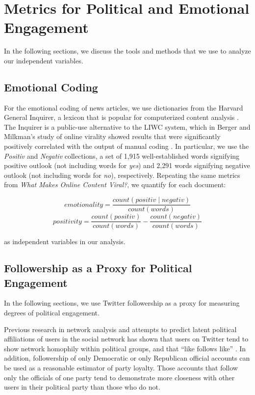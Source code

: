  \chapter{Metrics for Political and Emotional Engagement}

 In the following sections, we discuss the tools and methods that we use to analyze our independent variables.
 
\section{Emotional Coding}
For the emotional coding of news articles, we use dictionaries from the Harvard General Inquirer, a lexicon that is popular for computerized content analysis \cite{stone1963computer}. The Inquirer is a public-use alternative to the LIWC system, which in Berger and Milkman’s study of online virality showed results that were significantly positively correlated with the output of manual coding \cite{berger2012makes}. In particular, we use the \emph{Positiv} and \emph{Negativ} collections, a set of 1,915 well-established words signifying positive outlook (not including words for \emph{yes}) and 2,291 words signifying negative outlook (not including words for \emph{no}), respectively. Repeating the same metrics from \emph{What Makes Online Content Viral?}, we quantify for each document:

$$ emotionality = \frac{count(positiv \mid negativ)}{count(words)}$$
$$ positivity = \frac{count(positiv)}{count(words)} - \frac{count(negativ)}{count(words)}$$

as independent variables in our analysis.

 \section{Followership as a Proxy for Political Engagement}

In the following sections, we use Twitter followership as a proxy for measuring degrees of political engagement. 

Previous research in network analysis and attempts to predict latent political affiliations of users in the social network has shown that users on Twitter tend to show network homophily within political groups, and that ``like follows like'' \cite{colleoni2014echo}. In addition, followership of only Democratic or only Republican official accounts can be used as a reasonable estimator of party loyalty. Those accounts that follow only the officials of one party tend to demonstrate more closeness with other users in their political party than those who do not.
            
